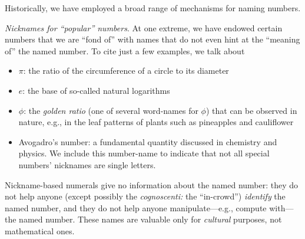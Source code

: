 \noindent
Historically, we have employed a broad range of mechanisms for naming
numbers.

{}
{}
{}

\noindent
{\it Nicknames for ``popular'' numbers}.
%
At one extreme, we have endowed certain numbers that we are ``fond
of'' with names that do not even hint at the ``meaning of'' the named
number.  To cite just a few examples, we talk about
\begin{itemize}
\item
$\pi$: the ratio of the circumference of a circle to its diameter
\item
$e$: the base of so-called natural logarithms
\item
$\phi$: the {\it golden ratio} (one of several word-names for $\phi$)
  that can be observed in nature, e.g., in the leaf patterns of plants
  such as pineapples and cauliflower
{}
{}
\item
Avogadro's number: a fundamental quantity discussed in chemistry and
physics.  We include this number-name to indicate that not all
special numbers' nicknames are single letters.
\end{itemize}
Nickname-based numerals give no information about the named number:
they do not help anyone (except possibly the {\it cognoscenti:} the
``in-crowd'') {\em identify} the named number, and they do not help
anyone manipulate---e.g., compute with---the named number.  These
names are valuable only for {\em cultural} purposes, not mathematical
ones.

